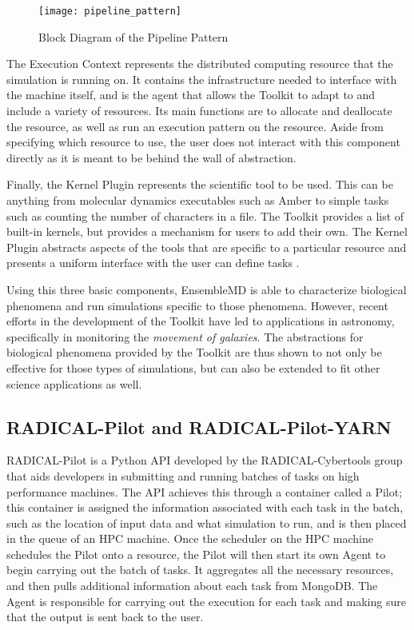 \documentclass[]{article}
\begin{document}
		\begin{figure}[H]
			\centering
			\texttt{[image: pipeline\_pattern]}
			\caption{Block Diagram of the Pipeline Pattern \cite{pipeline_pattern}}
			\label{fig:pipeline_block_diagram}
		\end{figure}

		The Execution Context represents the distributed computing resource that the simulation is running on. It contains the infrastructure needed to interface with the machine itself, and is the agent that allows the Toolkit to adapt to and include a variety of resources. Its main functions are to allocate and deallocate the resource, as well as run an execution pattern on the resource. Aside from specifying which resource to use, the user does not interact with this component directly as it is meant to be behind the wall of abstraction. 

		Finally, the Kernel Plugin represents the scientific tool to be used. This can be anything from molecular dynamics executables such as Amber to simple tasks such as counting the number of characters in a file. The Toolkit provides a list of built-in kernels, but provides a mechanism for users to add their own. The Kernel Plugin abstracts aspects of the tools that are specific to a particular resource and presents a uniform interface with the user can define tasks \cite{enmd_paper}.

		Using this three basic components, EnsembleMD is able to characterize biological phenomena and run simulations specific to those phenomena. However, recent efforts in the development of the Toolkit have led to applications in astronomy, specifically in monitoring the \textit{movement of galaxies}. The abstractions for biological phenomena provided by the Toolkit are thus shown to not only be effective for those types of simulations, but can also be extended to fit other science applications as well.

	\subsection{RADICAL-Pilot and RADICAL-Pilot-YARN}
		RADICAL-Pilot is a Python API developed by the RADICAL-Cybertools group that aids developers in submitting and running batches of tasks on high performance machines. The API achieves this through a container called a Pilot; this container is assigned the information associated with each task in the batch, such as the location of input data and what simulation to run, and is then placed in the queue of an HPC machine. Once the scheduler on the HPC machine schedules the Pilot onto a resource, the Pilot will then start its own Agent to begin carrying out the batch of tasks. It aggregates all the necessary resources, and then pulls additional information about each task from MongoDB. The Agent is responsible for carrying out the execution for each task and making sure that the output is sent back to the user.
\end{document}

